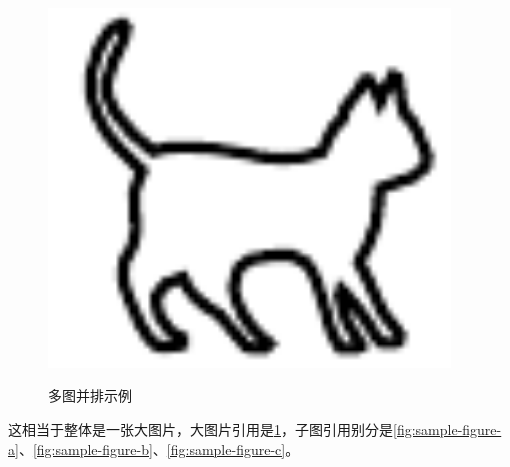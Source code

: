 \documentclass{cumcmthesis} %
\begin{document}
\begin{figure}[H]
\begin{minipage}[c]{0.3\textwidth}
        \label{fig:sample-figure-b}
    \end{minipage}
    \begin{minipage}[c]{0.3\textwidth}
        \centering
        \includegraphics[width=0.95\textwidth]{img/cat.pdf}
        \label{fig:sample-figure-c}
    \end{minipage}
    \caption{多图并排示例}
    \label{fig:sample-figure}
\end{figure}
这相当于整体是一张大图片，大图片引用是\cref{fig:sample-figure}，子图引用别分是\cref{fig:sample-figure-a}、\cref{fig:sample-figure-b}、\cref{fig:sample-figure-c}。

\end{document}
